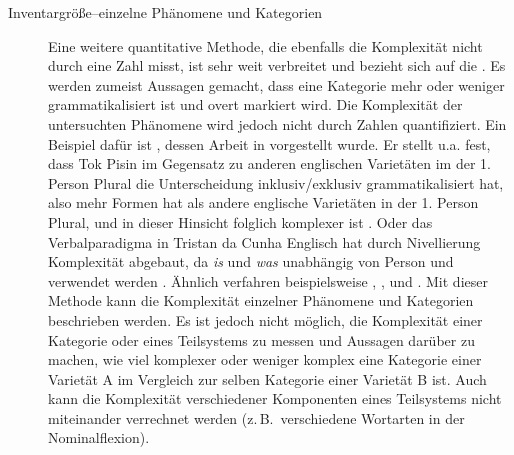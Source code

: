 \begin{exe}
\begin{exe}
\begin{description}
\item[Inventargröße--einzelne Phänomene und Kategorien] Eine weitere quantitative Methode, die ebenfalls die Komplexität nicht durch eine Zahl misst, ist sehr weit verbreitet und bezieht sich auf die . Es werden zumeist Aussagen gemacht, dass eine Kategorie mehr oder weniger grammatikalisiert ist und overt markiert wird. Die Komplexität der untersuchten Phänomene wird jedoch nicht durch Zahlen quantifiziert. Ein Beispiel dafür ist \citet{Schreier2016}, dessen Arbeit in  vorgestellt wurde. Er stellt u.a. fest, dass Tok Pisin im Gegensatz zu anderen englischen Varietäten im  der 1. Person Plural die Unterscheidung inklusiv/exklusiv grammatikalisiert hat, also mehr Formen hat als andere englische Varietäten in der 1. Person Plural, und in dieser Hinsicht folglich komplexer ist \citep[147]{Schreier2016}. Oder das Verbalparadigma in Tristan da Cunha Englisch hat durch Nivellierung Komplexität abgebaut, da \textit{is} und \textit{was} unabhängig von Person und  verwendet werden \citep[149]{Schreier2016}. Ähnlich verfahren beispielsweise \citet{Braunmüller1984}, \citet{McWhorter2001}, \citet{Kusters2003} und \citet{Trudgill2011}. Mit dieser Methode kann die Komplexität einzelner Phänomene und Kategorien beschrieben werden. Es ist jedoch nicht möglich, die Komplexität einer Kategorie oder eines Teilsystems zu messen und Aussagen darüber zu machen, wie viel komplexer oder weniger komplex eine Kategorie einer Varietät A im Vergleich zur selben Kategorie einer Varietät B ist. Auch kann die Komplexität verschiedener Komponenten eines Teilsystems nicht miteinander verrechnet werden (z.\,B.\ verschiedene Wortarten in der Nominalflexion).


\end{description}
\end{exe}
\end{exe}
